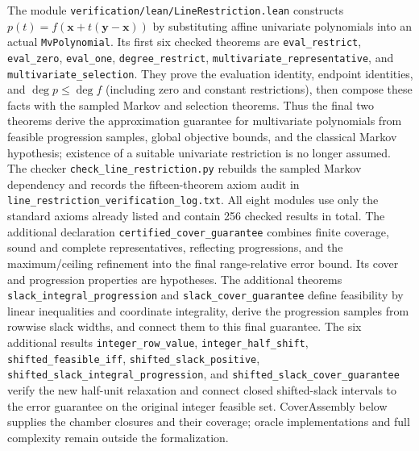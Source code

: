 \documentclass[11pt]{article}
\theoremstyle{definition}\newtheorem{definition}{Definition}[section]
\theoremstyle{remark}\newtheorem{remark}[theorem]{Remark}
\begin{document}
The module \texttt{verification/lean/LineRestriction.lean} constructs $p(t)=f(\mathbf{x}+t(\mathbf{y}-\mathbf{x}))$ by substituting affine univariate polynomials into an actual \texttt{MvPolynomial}. Its first six checked theorems are \texttt{eval\_restrict}, \texttt{eval\_zero}, \texttt{eval\_one}, \texttt{degree\_restrict}, \texttt{multivariate\_representative}, and \texttt{multivariate\_selection}. They prove the evaluation identity, endpoint identities, and $\deg p\le\deg f$ (including zero and constant restrictions), then compose these facts with the sampled Markov and selection theorems. Thus the final two theorems derive the approximation guarantee for multivariate polynomials from feasible progression samples, global objective bounds, and the classical Markov hypothesis; existence of a suitable univariate restriction is no longer assumed. The checker \texttt{check\_line\_restriction.py} rebuilds the sampled Markov dependency and records the fifteen-theorem axiom audit in \texttt{line\_restriction\_verification\_log.txt}. All eight modules use only the standard axioms already listed and contain 256 checked results in total. The additional declaration \texttt{certified\_cover\_guarantee} combines finite coverage, sound and complete representatives, reflecting progressions, and the maximum/ceiling refinement into the final range-relative error bound. Its cover and progression properties are hypotheses. The additional theorems \texttt{slack\_integral\_progression} and \texttt{slack\_cover\_guarantee} define feasibility by linear inequalities and coordinate integrality, derive the progression samples from rowwise slack widths, and connect them to this final guarantee. The six additional results \texttt{integer\_row\_value}, \texttt{integer\_half\_shift}, \texttt{shifted\_feasible\_iff}, \texttt{shifted\_slack\_positive}, \texttt{shifted\_slack\_integral\_progression}, and \texttt{shifted\_slack\_cover\_guarantee} verify the new half-unit relaxation and connect closed shifted-slack intervals to the error guarantee on the original integer feasible set. CoverAssembly below supplies the chamber closures and their coverage; oracle implementations and full complexity remain outside the formalization.
\end{document}
